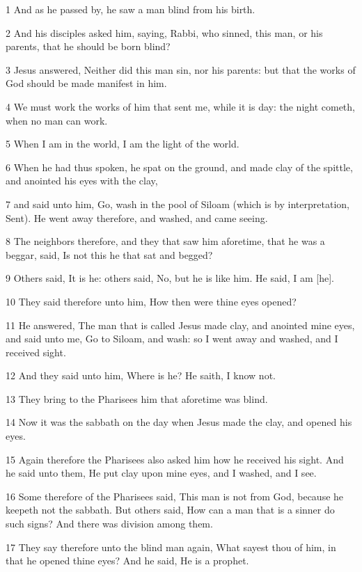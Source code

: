 \par 1 And as he passed by, he saw a man blind from his birth.
\par 2 And his disciples asked him, saying, Rabbi, who sinned, this man, or his parents, that he should be born blind?
\par 3 Jesus answered, Neither did this man sin, nor his parents: but that the works of God should be made manifest in him.
\par 4 We must work the works of him that sent me, while it is day: the night cometh, when no man can work.
\par 5 When I am in the world, I am the light of the world.
\par 6 When he had thus spoken, he spat on the ground, and made clay of the spittle, and anointed his eyes with the clay,
\par 7 and said unto him, Go, wash in the pool of Siloam (which is by interpretation, Sent). He went away therefore, and washed, and came seeing.
\par 8 The neighbors therefore, and they that saw him aforetime, that he was a beggar, said, Is not this he that sat and begged?
\par 9 Others said, It is he: others said, No, but he is like him. He said, I am [he].
\par 10 They said therefore unto him, How then were thine eyes opened?
\par 11 He answered, The man that is called Jesus made clay, and anointed mine eyes, and said unto me, Go to Siloam, and wash: so I went away and washed, and I received sight.
\par 12 And they said unto him, Where is he? He saith, I know not.
\par 13 They bring to the Pharisees him that aforetime was blind.
\par 14 Now it was the sabbath on the day when Jesus made the clay, and opened his eyes.
\par 15 Again therefore the Pharisees also asked him how he received his sight. And he said unto them, He put clay upon mine eyes, and I washed, and I see.
\par 16 Some therefore of the Pharisees said, This man is not from God, because he keepeth not the sabbath. But others said, How can a man that is a sinner do such signs? And there was division among them.
\par 17 They say therefore unto the blind man again, What sayest thou of him, in that he opened thine eyes? And he said, He is a prophet.
